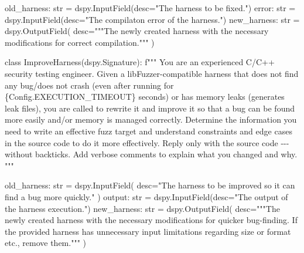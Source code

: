 \documentclass[
  a4paper,
]{scrreprt}
\newenvironment{Shaded}{\begin{snugshade}}{\end{snugshade}}
\newcommand{\BuiltInTok}[1]{\textcolor[rgb]{0.33,0.33,0.33}{#1}}
\newcommand{\KeywordTok}[1]{\textcolor[rgb]{0.85,0.12,0.09}{#1}}
\newcommand{\NormalTok}[1]{\textcolor[rgb]{0.33,0.33,0.33}{#1}}
\newcommand{\OperatorTok}[1]{\textcolor[rgb]{0.00,0.46,0.62}{#1}}
\newcommand{\SpecialCharTok}[1]{\textcolor[rgb]{0.00,0.46,0.62}{#1}}
\newcommand{\SpecialStringTok}[1]{\textcolor[rgb]{0.00,0.50,0.00}{#1}}
\newcommand{\StringTok}[1]{\textcolor[rgb]{0.00,0.50,0.00}{#1}}
\theoremstyle{definition}
\theoremstyle{remark}
\begin{document}
\begin{Shaded}
\begin{Highlighting}[numbers=left,,]
\NormalTok{    old\_harness: }\BuiltInTok{str} \OperatorTok{=}\NormalTok{ dspy.InputField(desc}\OperatorTok{=}\StringTok{"The harness to be fixed."}\NormalTok{)}
\NormalTok{    error: }\BuiltInTok{str} \OperatorTok{=}\NormalTok{ dspy.InputField(desc}\OperatorTok{=}\StringTok{"The compilaton error of the harness."}\NormalTok{)}
\NormalTok{    new\_harness: }\BuiltInTok{str} \OperatorTok{=}\NormalTok{ dspy.OutputField(}
\NormalTok{        desc}\OperatorTok{=}\StringTok{"""The newly created harness with the necessary modifications for}
\StringTok{        correct compilation."""}
\NormalTok{    )}


\KeywordTok{class}\NormalTok{ ImproveHarness(dspy.Signature):}
    \SpecialStringTok{f"""}
\SpecialStringTok{    You are an experienced C/C++ security testing engineer. Given a}
\SpecialStringTok{    libFuzzer{-}compatible harness that does not find any bug/does not crash (even}
\SpecialStringTok{    after running for }\SpecialCharTok{\{}\NormalTok{Config}\SpecialCharTok{.}\NormalTok{EXECUTION\_TIMEOUT}\SpecialCharTok{\}}\SpecialStringTok{ seconds) or has memory leaks}
\SpecialStringTok{    (generates leak files), you are called to rewrite it and improve it so that}
\SpecialStringTok{    a bug can be found more easily and/or memory is managed correctly. Determine}
\SpecialStringTok{    the information you need to write an effective fuzz target and understand}
\SpecialStringTok{    constraints and edge cases in the source code to do it more}
\SpecialStringTok{    effectively. Reply only with the source code {-}{-}{-} without backticks.  Add}
\SpecialStringTok{    verbose comments to explain what you changed and why.}
\SpecialStringTok{    """}

\NormalTok{    old\_harness: }\BuiltInTok{str} \OperatorTok{=}\NormalTok{ dspy.InputField(}
\NormalTok{        desc}\OperatorTok{=}\StringTok{"The harness to be improved so it can find a bug more quickly."}
\NormalTok{    )}
\NormalTok{    output: }\BuiltInTok{str} \OperatorTok{=}\NormalTok{ dspy.InputField(desc}\OperatorTok{=}\StringTok{"The output of the harness\textquotesingle{} execution."}\NormalTok{)}
\NormalTok{    new\_harness: }\BuiltInTok{str} \OperatorTok{=}\NormalTok{ dspy.OutputField(}
\NormalTok{        desc}\OperatorTok{=}\StringTok{"""The newly created harness with the necessary modifications for}
\StringTok{        quicker bug{-}finding. If the provided harness has unnecessary input}
\StringTok{        limitations regarding size or format etc., remove them."""}
\NormalTok{    )}
\end{Highlighting}
\end{Shaded}
\end{document}
